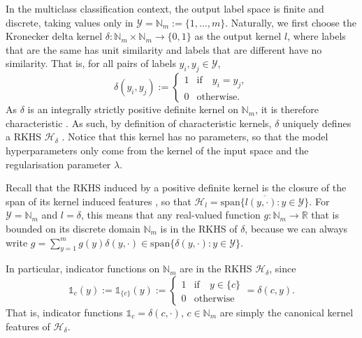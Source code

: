 \documentclass{article}
\begin{document}
	In the multiclass classification context, the output label space is finite and discrete, taking values only in $\mathcal{Y} = \mathbb{N}_{m} := \{1, \dots, m\}$. Naturally, we first choose the Kronecker delta kernel $\delta : \mathbb{N}_{m} \times \mathbb{N}_{m} \to \{0, 1\}$ as the output kernel $l$, where labels that are the same has unit similarity and labels that are different have no similarity. That is, for all pairs of labels $y_{i}, y_{j} \in \mathcal{Y}$,
	\begin{equation}
		\delta(y_{i}, y_{j}) := \begin{cases}
		1 & \mathrm{if } \quad y_{i} = y_{j}, \\
		0 & \mathrm{otherwise}.
		\end{cases}
	\end{equation}
	As $\delta$ is an integrally strictly positive definite kernel on $\mathbb{N}_{m}$, it is therefore characteristic \citep[Theorem 7]{sriperumbudur2010hilbert}. As such, by definition of characteristic kernels, $\delta$ uniquely defines a RKHS $\mathcal{H}_{\delta}$ \citep{fukumizu2004dimensionality}. Notice that this kernel has no parameters, so that the model hyperparameters only come from the kernel of the input space and the regularisation parameter $\lambda$.
	
	Recall that the RKHS induced by a positive definite kernel is the closure of the span of its kernel induced features \citep{xu2009refinement}, so that $\mathcal{H}_{l} = \overline{\mathrm{span}\{l(y, \cdot) : y \in \mathcal{Y}\}}$. For $\mathcal{Y} = \mathbb{N}_{m}$ and $l = \delta$, this means that any real-valued function $g : \mathbb{N}_{m} \to \mathbb{R}$ that is bounded on its discrete domain $\mathbb{N}_{m}$ is in the RKHS of $\delta$, because we can always write $g = \sum_{y = 1}^{m} g(y) \delta(y, \cdot) \in \mathrm{span}\{\delta(y, \cdot) : y \in \mathcal{Y}\}$.
	
	In particular, indicator functions on $\mathbb{N}_{m}$ are in the RKHS $\mathcal{H}_{\delta}$, since
	\begin{equation}
		\mathbb{1}_{c}(y) := \mathbb{1}_{\{c\}}(y) := \begin{cases}
		1 & \mathrm{if } \quad y \in \{c\} \\
		0 & \mathrm{otherwise}
		\end{cases} = \delta(c, y).
	\label{eq:indicator_function}
	\end{equation}
	That is, indicator functions $\mathbb{1}_{c} = \delta(c, \cdot)$, $c \in \mathbb{N}_{m}$ are simply the canonical kernel features of $\mathcal{H}_{\delta}$. 
	
\end{document}
